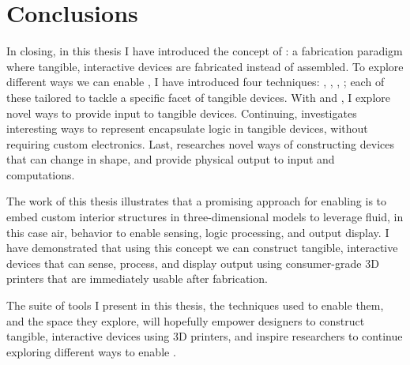 \chapter{Conclusions} \label{ch:conclusion}
  In closing, in this thesis I have introduced the concept of \papf: a
  fabrication paradigm where tangible, interactive devices are fabricated
  instead of assembled. To explore different ways we can enable \papf, I have
  introduced four techniques: \at, \bh, \al, \mp; each of these tailored to
  tackle a specific facet of tangible devices. With \at and \bh, I explore novel
  ways to provide input to tangible devices. Continuing, \al investigates
  interesting ways to represent encapsulate logic in tangible devices, without
  requiring custom electronics.  Last, \mp researches novel ways of constructing
  devices that can change in shape, and provide physical output to input and
  computations.

  The work of this thesis illustrates that a promising approach for enabling
  \papf is to embed custom interior structures in three-dimensional models
  to leverage fluid, in this case air, behavior to enable sensing, logic
  processing, and output display. I have demonstrated that using this
  concept we can construct tangible, interactive devices that can sense,
  process, and display output using consumer-grade 3D printers that are
  immediately usable after fabrication.

  The suite of tools I present in this thesis, the techniques used to enable
  them, and the space they explore, will hopefully empower designers to
  construct tangible, interactive devices using 3D printers, and inspire
  researchers to continue exploring different ways to enable \papf.
